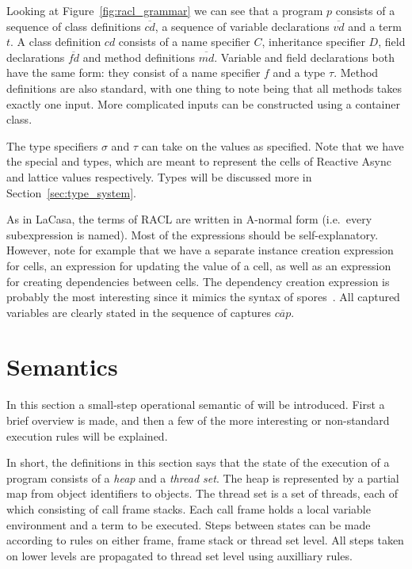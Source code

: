 Looking at Figure~\ref{fig:racl_grammar} we can see that a program $p$ consists
of a sequence of class definitions $\overline{cd}$, a sequence of variable
declarations $\overline{vd}$ and a term $t$. A class definition $cd$ consists of
a name specifier $C$, inheritance specifier $D$, field declarations
$\overline{fd}$ and method definitions $\overline{md}$. Variable and field
declarations both have the same form: they consist of a name specifier $f$ and a
type $\tau$. Method definitions are also standard, with one thing to note being
that all methods takes exactly one input.  More complicated inputs can be
constructed using a container class.

The type specifiers $\sigma$ and $\tau$ can take on the values as specified.
Note that we have the special \CellType{} and \LatType{} types, which are meant
to represent the cells of Reactive Async and lattice values respectively. Types
will be discussed more in Section~\ref{sec:type_system}.

As in LaCasa, the terms of RACL are written in A-normal form (i.e.\ every
subexpression is named). Most of the expressions should be self-explanatory.
However, note for example that we have a separate instance creation expression
for cells, an expression for updating the value of a cell, as well as an
expression for creating dependencies between cells. The dependency creation
expression is probably the most interesting since it mimics the syntax of
spores~\parencite{conf/ecoop/MillerHO14}. All captured variables are clearly
stated in the sequence of captures $\overline{cap}$. 

\section{Semantics}%
\label{sec:semantics}

In this section a small-step operational semantic of \RACL{} will be
introduced. First a brief overview is made, and then a few of the more
interesting or non-standard execution rules will be explained.

In short, the definitions in this section says that the state of the
execution of a \RACL{} program consists of a \emph{heap} and a \emph{thread
set}. The heap is represented by a partial map from object identifiers 
to objects. The thread set is a set of threads, each of which
consisting of call frame stacks. Each call frame holds a local variable
environment and a term to be executed. Steps between states can be made according
to rules on either frame, frame stack or thread set level. All steps taken on
lower levels are propagated to thread set level using auxilliary rules. 

